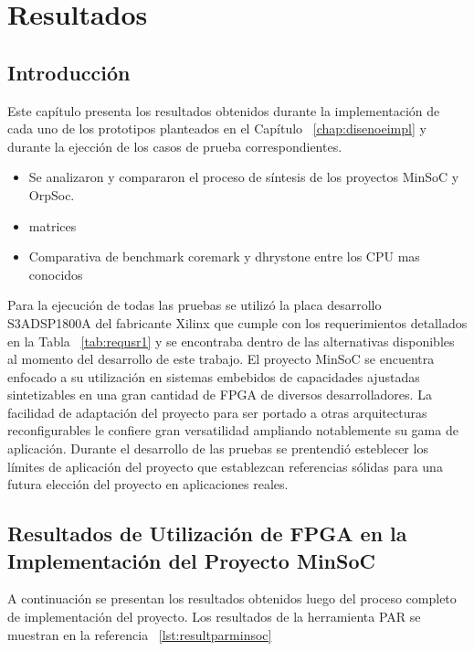 \chapter{Resultados}
	\section{Introducción} 
	
	Este capítulo presenta los resultados obtenidos durante la implementación de cada uno de los prototipos planteados en el Capítulo
	~\ref{chap:disenoeimpl} y durante la ejección de los casos de prueba correspondientes. 
	\begin{itemize}
				  	\item Se analizaron y compararon el proceso de síntesis de los proyectos MinSoC y OrpSoc. 
					\item matrices
					\item Comparativa de benchmark coremark y dhrystone entre los CPU mas conocidos					
				\end{itemize}				
				
	Para la ejecución de todas las pruebas se utilizó la placa desarrollo S3ADSP1800A del fabricante Xilinx que cumple con los requerimientos detallados
	en la Tabla ~\ref{tab:requsr1} y se encontraba dentro de las alternativas disponibles al momento del desarrollo de este trabajo.
El proyecto MinSoC se encuentra enfocado a su utilización en sistemas embebidos de capacidades ajustadas sintetizables en una gran cantidad de FPGA
	de diversos desarrolladores. La facilidad de adaptación del proyecto para ser portado a otras arquitecturas reconfigurables le confiere gran
	versatilidad ampliando notablemente su gama de aplicación.
	Durante el desarrollo de las pruebas se prentendió esteblecer los límites de aplicación del proyecto que establezcan referencias sólidas para una
	futura elección del proyecto en aplicaciones reales.

	\newpage
	\section{Resultados de Utilización de FPGA en la Implementación del Proyecto MinSoC}

	A continuación se presentan los resultados obtenidos luego del proceso completo de implementación del proyecto.  Los resultados de la herramienta PAR
	se muestran en la referencia ~\ref{lst:resultparminsoc}

